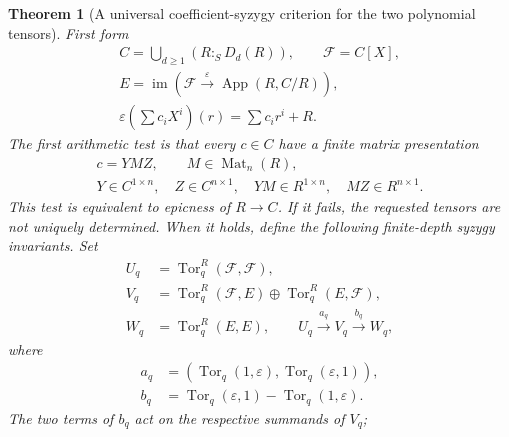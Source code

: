 \documentclass[11pt,a4paper]{article}
\newtheorem{theorem}{Theorem}[section]
\theoremstyle{definition}
\begin{document}
\begin{theorem}[A universal coefficient-syzygy criterion for the two polynomial tensors]
First form
\begin{equation}
\begin{gathered}
 C=\bigcup_{d\ge1}(R:_S D_d(R)),\qquad \mathcal F=C[X],\\
 E=\operatorname{im}\left(\mathcal F\xrightarrow{\varepsilon}
                       \operatorname{App}(R,C/R)\right),\\
 \varepsilon\left(\sum c_iX^i\right)(r)=\sum c_ir^i+R.
\end{gathered}
                                                        \label{equation-50}
\end{equation}
The first arithmetic test is that every $c\in C$ have a finite
matrix presentation
\begin{equation}
\begin{gathered}
 c=Y M Z,\qquad M\in\operatorname{Mat}_{n}(R),\\
 Y\in C^{1\times n},\quad Z\in C^{n\times1},\quad
 YM\in R^{1\times n},\quad MZ\in R^{n\times1}.
\end{gathered}                                           \label{equation-51}
\end{equation}
This test is equivalent to epicness of $R\to C$.
If it fails, the requested tensors are not uniquely determined.
When it holds, define the following finite-depth syzygy invariants.
Set
\begin{equation}
\begin{aligned}
 U_q&=\operatorname{Tor}_q^R(\mathcal F,\mathcal F),\\
 V_q&=\operatorname{Tor}_q^R(\mathcal F,E)
                    \oplus\operatorname{Tor}_q^R(E,\mathcal F),\\
 W_q&=\operatorname{Tor}_q^R(E,E),\qquad
 U_q\xrightarrow{a_q}V_q\xrightarrow{b_q}W_q,
\end{aligned}                                           \label{equation-52}
\end{equation}
where
\begin{equation}
\begin{aligned}
 a_q&=(\operatorname{Tor}_q(1,\varepsilon),
                         \operatorname{Tor}_q(\varepsilon,1)),\\
 b_q&=\operatorname{Tor}_q(\varepsilon,1)
                        -\operatorname{Tor}_q(1,\varepsilon).
\end{aligned}
                                                        \label{equation-53}
\end{equation}
The two terms of $b_q$ act on the respective summands of $V_q$;

\end{theorem}
\end{document}
